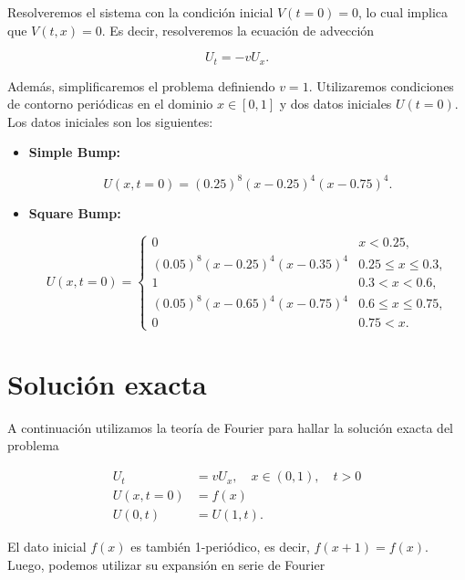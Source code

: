 \documentclass[12pt]{article}
\begin{document}
Resolveremos el sistema con la condici\'on inicial $V(t=0) = 0$, lo cual implica que $V(t, x) = 0$. Es decir, resolveremos la ecuaci\'on de advecci\'on

\begin{equation}\label{eq:adv}
U_t = - v U_x.
\end{equation}

Adem\'as, simplificaremos el problema definiendo $v = 1$. Utilizaremos condiciones de contorno peri\'odicas en el dominio $x\in [0,1]$ y dos datos iniciales $U(t=0)$. Los datos iniciales son los siguientes:

\begin{itemize}
\item \textbf{Simple Bump:} 

\begin{equation}
U(x, t=0) = (0.25)^{8}(x - 0.25)^4 (x - 0.75)^4.
\end{equation}

\item \textbf{Square Bump:} 

\begin{equation}
U(x, t=0) = 
\begin{cases}
0 & x < 0.25,\\
(0.05)^8(x-0.25)^4 (x-0.35)^4 & 0.25 \leq x \leq 0.3, \\
1 & 0.3 < x < 0.6, \\
(0.05)^8(x-0.65)^4 (x-0.75)^4 & 0.6 \leq x \leq 0.75, \\
0 & 0.75 < x.
\end{cases}
\end{equation}

\end{itemize}

\section{Soluci\'on exacta}

A continuaci\'on utilizamos la teor\'ia de Fourier para hallar la soluci\'on exacta del problema

\begin{align*}
U_t &= v U_x,\quad x\in (0, 1), \quad t > 0 \\
U(x, t=0) &= f(x)\\
U(0, t) &= U(1, t).
\end{align*}

El dato inicial $f(x)$ es tambi\'en 1-peri\'odico, es decir, $f(x+1) = f(x)$. Luego, podemos utilizar su expansi\'on en serie de Fourier
\end{document}
